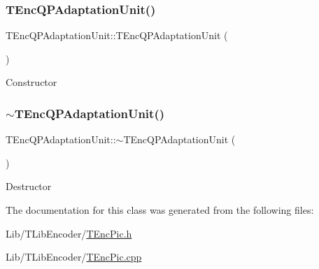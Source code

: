 \subsubsection{\texorpdfstring{T\+Enc\+Q\+P\+Adaptation\+Unit()}{TEncQPAdaptationUnit()}}
{\footnotesize\ttfamily T\+Enc\+Q\+P\+Adaptation\+Unit\+::\+T\+Enc\+Q\+P\+Adaptation\+Unit (\begin{DoxyParamCaption}{ }\end{DoxyParamCaption})}

Constructor \mbox{\label{class_t_enc_q_p_adaptation_unit_ac7108fa56c7fa77c27cbb4c9158ade65}} 
\subsubsection{\texorpdfstring{$\sim$\+T\+Enc\+Q\+P\+Adaptation\+Unit()}{~TEncQPAdaptationUnit()}}
{\footnotesize\ttfamily T\+Enc\+Q\+P\+Adaptation\+Unit\+::$\sim$\+T\+Enc\+Q\+P\+Adaptation\+Unit (\begin{DoxyParamCaption}{ }\end{DoxyParamCaption})}

Destructor 

The documentation for this class was generated from the following files\+:\begin{DoxyCompactItemize}
\item 
Lib/\+T\+Lib\+Encoder/\hyperlink{_t_enc_pic_8h}{T\+Enc\+Pic.\+h}\item 
Lib/\+T\+Lib\+Encoder/\hyperlink{_t_enc_pic_8cpp}{T\+Enc\+Pic.\+cpp}\end{DoxyCompactItemize}
